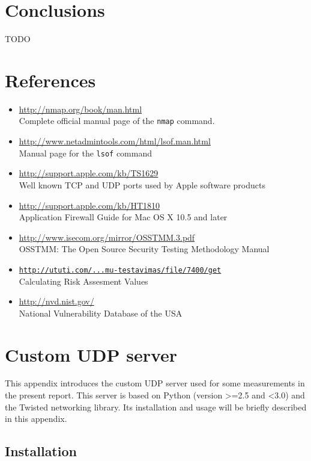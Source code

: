 \documentclass[10pt,a4paper,twoside,onecolumn]{article}
\begin{document}
\section{Conclusions}

TODO

\section{References}

\begin{itemize}
	\item \url{http://nmap.org/book/man.html}\\Complete official manual page of the \texttt{nmap} command.
	\item \url{http://www.netadmintools.com/html/lsof.man.html}\\Manual page for the \texttt{lsof} command
	\item \url{http://support.apple.com/kb/TS1629}\\Well known TCP and UDP ports used by Apple software products
	\item \url{http://support.apple.com/kb/HT1810}\\Application Firewall Guide for Mac OS X 10.5 and later
	\item \url{http://www.isecom.org/mirror/OSSTMM.3.pdf}\\OSSTMM: The Open Source Security Testing Methodology Manual
	\item \href{http://ututi.com/subject/vu/mif/programu-sistemu-testavimas/file/7400/get}{\texttt{http://ututi.com/...mu-testavimas/file/7400/get}}\\Calculating Risk Assesment Values
	\item \url{http://nvd.nist.gov/}\\National Vulnerability Database of the USA
\end{itemize}

\appendix
\section{Custom UDP server}
\label{sec:udp-server}

This appendix introduces the custom UDP server used for some measurements in the present report. This server is based on Python (version >=2.5 and <3.0) and the Twisted networking library. Its installation and usage will be briefly described in this appendix.

\subsection{Installation}
\end{document}
